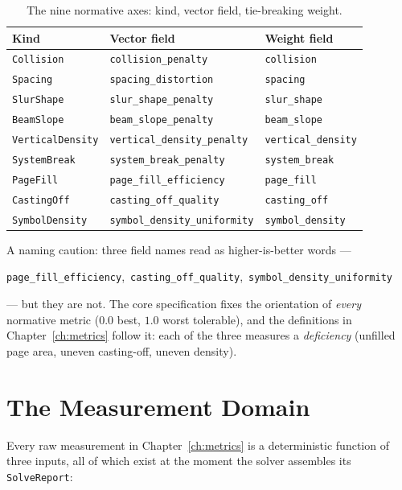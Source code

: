 \documentclass[11pt,letterpaper]{report}
\begin{document}
\begin{table}[h]
\centering
\small
\begin{tabular}{lll}
\toprule
\textbf{Kind} & \textbf{Vector field} & \textbf{Weight field} \\
\midrule
\texttt{Collision}       & \texttt{collision\_penalty}          & \texttt{collision} \\
\texttt{Spacing}         & \texttt{spacing\_distortion}         & \texttt{spacing} \\
\texttt{SlurShape}       & \texttt{slur\_shape\_penalty}        & \texttt{slur\_shape} \\
\texttt{BeamSlope}       & \texttt{beam\_slope\_penalty}        & \texttt{beam\_slope} \\
\texttt{VerticalDensity} & \texttt{vertical\_density\_penalty}  & \texttt{vertical\_density} \\
\texttt{SystemBreak}     & \texttt{system\_break\_penalty}      & \texttt{system\_break} \\
\texttt{PageFill}        & \texttt{page\_fill\_efficiency}      & \texttt{page\_fill} \\
\texttt{CastingOff}      & \texttt{casting\_off\_quality}       & \texttt{casting\_off} \\
\texttt{SymbolDensity}   & \texttt{symbol\_density\_uniformity} & \texttt{symbol\_density} \\
\bottomrule
\end{tabular}
\caption{The nine normative axes: kind, vector field, tie-breaking weight.}
\label{tab:kind-mapping}
\end{table}

A naming caution: three field names read as higher-is-better words ---
\begin{center}
\texttt{page\_fill\_efficiency},\ \texttt{casting\_off\_quality},\ \texttt{symbol\_density\_uniformity}
\end{center}
--- but they are not. The core specification fixes the orientation of
\emph{every} normative metric ($0.0$ best, $1.0$ worst tolerable), and
the definitions in Chapter~\ref{ch:metrics} follow it: each of the three
measures a \emph{deficiency} (unfilled page area, uneven casting-off,
uneven density).

\section{The Measurement Domain}
\label{sec:model:domain}

Every raw measurement in Chapter~\ref{ch:metrics} is a deterministic
function of three inputs, all of which exist at the moment the solver
assembles its \texttt{SolveReport}:
\end{document}
